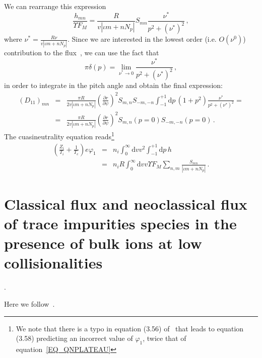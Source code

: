  We can rearrange this expression
 \begin{equation}
 \frac{h_{mn}}{\Upsilon F_M}  = \frac{R}{v|\iota m + nN_p|}S_{mn}\frac{\nu^*}{p^2+(\nu^*)^2}\,,
  \end{equation}
 where $\nu^*=\frac{R\nu}{v|\iota m +nN_p|}$. Since we are interested in the lowest order (i.e. $O(\nu^0)$) contribution to the flux~\citep{alonso2017JPP}, we can use the fact that
 \begin{equation}
 \pi \delta(p)=\lim_{\nu^*\rightarrow 0}\frac{\nu^*}{p^2+(\nu^*)^2}\,,
 \end{equation}
 in order to integrate in the pitch angle and obtain the final expression:
 \begin{eqnarray}
  (D_{11})_{mn}&=& \frac{\pi R}{2v|\iota m + nN_p|}\left(\frac{\partial r}{\partial\psi}\right)^2 S_{m,n}S_{-m,-n} \int_{-1}^{+1}\mathrm{d}p\,(1+p^2)\frac{\nu^*}{p^2+(\nu^*)^2} = \nonumber\\ &=&  \frac{\pi R}{2v|\iota m + nN_p|}\left(\frac{\partial r}{\partial\psi}\right)^2 S_{m,n}(p=0)S_{-m,-n}(p=0)\,.\label{EQ_D11PLATEAU}
 \end{eqnarray}
 The cuasineutrality equation reads\footnote{We note that there is a typo in equation (3.56) of~\citep{alonso2017JPP} that leads to equation (3.58) predicting an incorrect value of $\varphi_1$, twice that of equation~\ref{EQ_QNPLATEAU}}
 \begin{eqnarray}
\left(\frac{Z_i}{T_i}+\frac{1}{T_e}\right) e \varphi_1&=& n_i \int_0^\infty\mathrm{d}v v^2 \int_{-1}^{+1}\mathrm{d}p\,h \nonumber\\ 
&=& n_i R \int_0^\infty\mathrm{d}v v \Upsilon F_M \sum_{n,m} \frac{S_{mn}}{|\iota m + nN_p|}\,.\label{EQ_QNPLATEAU}
 \end{eqnarray}




\section{Classical flux and neoclassical flux of trace impurities species in the presence of bulk ions at low collisionalities}\label{SEC_CLANC}.

Here we follow~\citep{calvo2018nf,calvo2019anis}.


